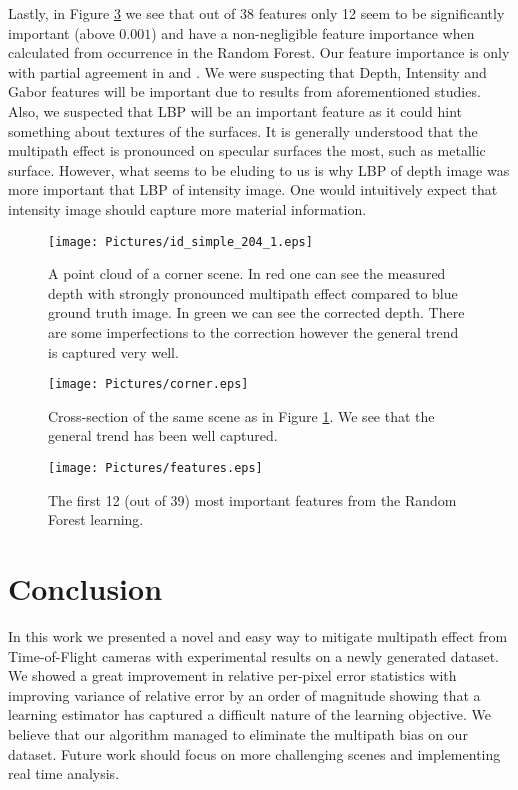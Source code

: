 \documentclass[11pt,twocolumn]{article}
\begin{document}
Lastly, in Figure \ref{fig:f} we see that out of 38 features only 12 seem to be significantly important (above $0.001$) and have a non-negligible feature importance when calculated from occurrence in the Random Forest. Our feature importance is only with partial agreement in \cite{Reynolds2011} and \cite{Song2014}. We were suspecting that Depth, Intensity and Gabor features will be important due to results from aforementioned studies. Also, we suspected that LBP will be an important feature as it could hint something about textures of the surfaces. It is generally understood that the multipath effect is pronounced on specular surfaces the most, such as metallic surface. However, what seems to be eluding to us is why LBP of depth image was more important that LBP of intensity image. One would intuitively expect that intensity image should capture more material information.
\begin{figure}
    \centering
    \texttt{[image: Pictures/id\_simple\_204\_1.eps]}
    \caption{A point cloud of a corner scene. In  red one can see the measured depth with strongly pronounced multipath effect compared to blue ground truth image. In green we can see the corrected depth. There are some imperfections to the correction however the general trend is captured very well.}
    \label{fig:c}
\end{figure}
\begin{figure}
    \centering
    \texttt{[image: Pictures/corner.eps]}
    \caption{Cross-section of the same scene as in Figure \ref{fig:c}. We see that the general trend has been well captured.}
    \label{fig:e}
\end{figure}
\begin{figure}
    \centering
    \texttt{[image: Pictures/features.eps]}
    \caption{The first 12 (out of 39) most important features from the Random Forest learning.}
    \label{fig:f}
\end{figure}
\section{Conclusion}
In this work we presented a novel and easy way to mitigate multipath effect from Time-of-Flight cameras with experimental results on a newly generated dataset. We showed a great improvement in relative per-pixel error statistics with improving variance of relative error by an order of magnitude showing that a learning estimator has captured a difficult nature of the learning objective. We believe that our algorithm managed to eliminate the multipath bias on our dataset. Future work should focus on more challenging scenes and implementing real time analysis.


\end{document}

